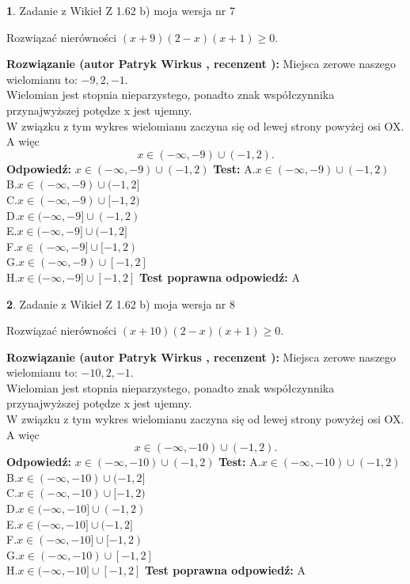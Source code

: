 \documentclass[12pt, a4paper]{article}
\theoremstyle{definition} %
\newtheorem{zad}{}
\newcommand{\zadStart}[1]{\begin{zad}#1\newline}
\newcommand{\zadStop}{\end{zad}}
\newcommand{\rozwStart}[2]{\noindent \textbf{Rozwiązanie (autor #1 , recenzent #2): }\newline}
\newcommand{\rozwStop}{\newline}
\newcommand{\odpStart}{\noindent \textbf{Odpowiedź:}\newline}
\newcommand{\odpStop}{\newline}
\newcommand{\testStart}{\noindent \textbf{Test:}\newline}
\newcommand{\testStop}{\newline}
\newcommand{\kluczStart}{\noindent \textbf{Test poprawna odpowiedź:}\newline}
\newcommand{\kluczStop}{\newline}
\begin{document}
\zadStart{Zadanie z Wikieł Z 1.62 b) moja wersja nr 7}

Rozwiązać nierówności $(x+9)(2-x)(x+1)\ge0$.
\zadStop
\rozwStart{Patryk Wirkus}{}
Miejsca zerowe naszego wielomianu to: $-9, 2, -1$.\\
Wielomian jest stopnia nieparzystego, ponadto znak współczynnika przy\linebreak najwyższej potędze x jest ujemny.\\ W związku z tym wykres wielomianu zaczyna się od lewej strony powyżej osi OX. A więc $$x \in (-\infty,-9) \cup (-1,2).$$
\rozwStop
\odpStart
$x \in (-\infty,-9) \cup (-1,2)$
\odpStop
\testStart
A.$x \in (-\infty,-9) \cup (-1,2)$\\
B.$x \in (-\infty,-9) \cup (-1,2]$\\
C.$x \in (-\infty,-9) \cup [-1,2)$\\
D.$x \in (-\infty,-9] \cup (-1,2)$\\
E.$x \in (-\infty,-9] \cup (-1,2]$\\
F.$x \in (-\infty,-9] \cup [-1,2)$\\
G.$x \in (-\infty,-9) \cup [-1,2]$\\
H.$x \in (-\infty,-9] \cup [-1,2]$
\testStop
\kluczStart
A
\kluczStop



\zadStart{Zadanie z Wikieł Z 1.62 b) moja wersja nr 8}

Rozwiązać nierówności $(x+10)(2-x)(x+1)\ge0$.
\zadStop
\rozwStart{Patryk Wirkus}{}
Miejsca zerowe naszego wielomianu to: $-10, 2, -1$.\\
Wielomian jest stopnia nieparzystego, ponadto znak współczynnika przy\linebreak najwyższej potędze x jest ujemny.\\ W związku z tym wykres wielomianu zaczyna się od lewej strony powyżej osi OX. A więc $$x \in (-\infty,-10) \cup (-1,2).$$
\rozwStop
\odpStart
$x \in (-\infty,-10) \cup (-1,2)$
\odpStop
\testStart
A.$x \in (-\infty,-10) \cup (-1,2)$\\
B.$x \in (-\infty,-10) \cup (-1,2]$\\
C.$x \in (-\infty,-10) \cup [-1,2)$\\
D.$x \in (-\infty,-10] \cup (-1,2)$\\
E.$x \in (-\infty,-10] \cup (-1,2]$\\
F.$x \in (-\infty,-10] \cup [-1,2)$\\
G.$x \in (-\infty,-10) \cup [-1,2]$\\
H.$x \in (-\infty,-10] \cup [-1,2]$
\testStop
\kluczStart
A
\kluczStop
\end{document}
